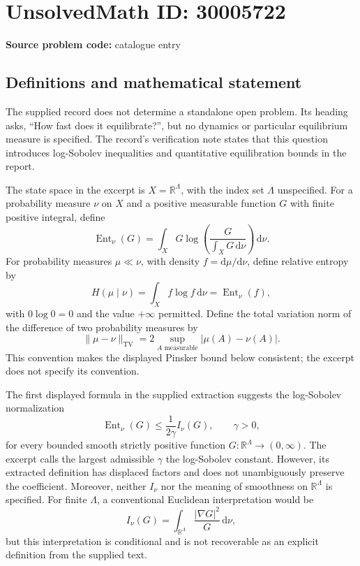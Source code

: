 \documentclass[11pt]{article}
\newcommand{\R}{\mathbb{R}}
\begin{document}
\section*{UnsolvedMath ID: 30005722}
\textbf{Source problem code:} catalogue entry
\subsection{Definitions and mathematical statement}
The supplied record does not determine a standalone open problem. Its heading asks, ``How fast does it equilibrate?'', but no dynamics or particular equilibrium measure is specified. The record's verification note states that this question introduces log-Sobolev inequalities and quantitative equilibration bounds in the report.

The state space in the excerpt is \(X=\R^\Lambda\), with the index set \(\Lambda\) unspecified. For a probability measure \(\nu\) on \(X\) and a positive measurable function \(G\) with finite positive integral, define
\[
\operatorname{Ent}_\nu(G)=\int_X G\log\!\left(\frac{G}{\int_XG\,\mathrm d\nu}\right)\,\mathrm d\nu.
\]
For probability measures \(\mu\ll\nu\), with density \(f=\mathrm d\mu/\mathrm d\nu\), define relative entropy by
\[
H(\mu\mid\nu)=\int_X f\log f\,\mathrm d\nu
=\operatorname{Ent}_\nu(f),
\]
with \(0\log0=0\) and the value \(+\infty\) permitted. Define the total variation norm of the difference of two probability measures by
\[
\|\mu-\nu\|_{\mathrm{TV}}=2\sup_{A\text{ measurable}}|\mu(A)-\nu(A)|.
\]
This convention makes the displayed Pinsker bound below consistent; the excerpt does not specify its convention.

The first displayed formula in the supplied extraction suggests the log-Sobolev normalization
\[
\operatorname{Ent}_\nu(G)\leq\frac{1}{2\gamma}I_\nu(G),\qquad \gamma>0,
\]
for every bounded smooth strictly positive function \(G:\R^\Lambda\to(0,\infty)\). The excerpt calls the largest admissible \(\gamma\) the log-Sobolev constant. However, its extracted definition has displaced factors and does not unambiguously preserve the coefficient. Moreover, neither \(I_\nu\) nor the meaning of smoothness on \(\R^\Lambda\) is specified. For finite \(\Lambda\), a conventional Euclidean interpretation would be
\[
I_\nu(G)=\int_{\R^\Lambda}\frac{|\nabla G|^2}{G}\,\mathrm d\nu,
\]
but this interpretation is conditional and is not recoverable as an explicit definition from the supplied text.
\end{document}
